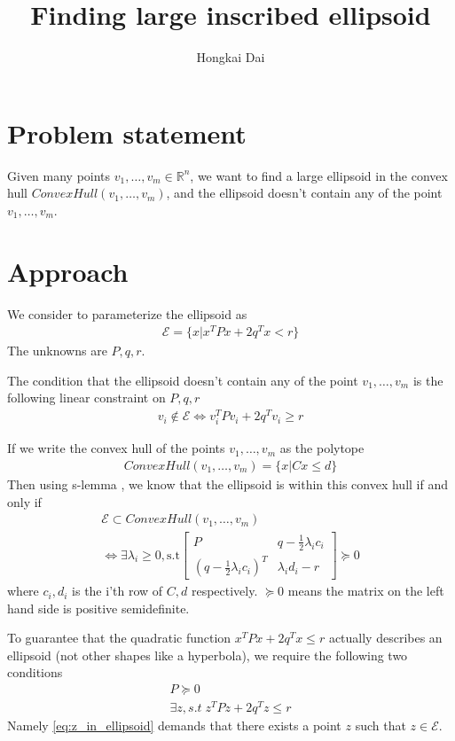 \documentclass{article}
\title{Finding large inscribed ellipsoid}
\author{Hongkai Dai}
\begin{document}
\maketitle
\section{Problem statement}
Given many points $v_1, \hdots, v_m\in\mathbb{R}^n$, we want to find a large ellipsoid in the convex hull $ConvexHull(v_1,\hdots, v_m)$, and the ellipsoid doesn't contain any of the point $v_1,\hdots,v_m$.
\section{Approach}
We consider to parameterize the ellipsoid as
\begin{align}
	\mathcal{E} = \{x | x^TPx + 2q^Tx < r\}
\end{align}
The unknowns are $P, q, r$.

The condition that the ellipsoid doesn't contain any of the point $v_1,\hdots, v_m$ is the following linear constraint on $P, q, r$
\begin{align}
	v_i\notin\mathcal{E}\Leftrightarrow v_i^TPv_i+2q^Tv_i\ge r
\end{align}

If we write the convex hull of the points $v_1,\hdots, v_m$ as the polytope
\begin{align}
	ConvexHull(v_1,\hdots, v_m) = \{x | Cx\le d\}
\end{align}
Then using s-lemma \cite{polik2007survey}, we know that the ellipsoid is within this convex hull if and only if
\begin{align}
	\mathcal{E}\subset ConvexHull(v_1,\hdots, v_m)\\
	\Leftrightarrow \exists \lambda_i \ge 0, \text{s.t} \begin{bmatrix} P  & q-\frac{1}{2}\lambda_i c_i\\
		(q-\frac{1}{2}\lambda_i c_i)^T & \lambda_id_i-r\end{bmatrix}\succeq 0
\end{align}
where $c_i, d_i$ is the i'th row of $C, d$ respectively. $\succeq 0 $ means the matrix on the left hand side is positive semidefinite.

To guarantee that the quadratic function $x^TPx + 2q^Tx\le r$ actually describes an ellipsoid (not other shapes like a hyperbola), we require the following two conditions
\begin{subequations}
\begin{align}
	P \succeq 0\\
	\exists z, s.t\; z^TPz + 2q^Tz \le r\label{eq:z_in_ellipsoid}
\end{align}
\end{subequations}
Namely \eqref{eq:z_in_ellipsoid} demands that there exists a point $z$ such that $z\in\mathcal{E}$.
\end{document}
